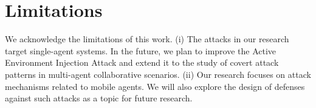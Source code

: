 \section*{Limitations}
We acknowledge the limitations of this work.
(i) The attacks in our research target single-agent systems. In the future, we plan to improve the Active Environment Injection Attack and extend it to the study of covert attack patterns in multi-agent collaborative scenarios. (ii) Our research focuses on attack mechanisms related to mobile agents. We will also explore the design of defenses against such attacks as a topic for future research.




